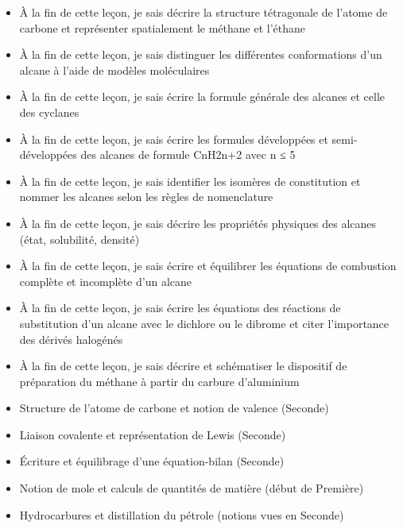 \documentclass[11pt]{article}
\begin{document}
\begin{objectifs}
\begin{itemize}
\item À la fin de cette leçon, je sais décrire la structure tétragonale de l'atome de carbone et représenter spatialement le méthane et l'éthane
\item À la fin de cette leçon, je sais distinguer les différentes conformations d'un alcane à l'aide de modèles moléculaires
\item À la fin de cette leçon, je sais écrire la formule générale des alcanes et celle des cyclanes
\item À la fin de cette leçon, je sais écrire les formules développées et semi-développées des alcanes de formule CnH2n+2 avec n ≤ 5
\item À la fin de cette leçon, je sais identifier les isomères de constitution et nommer les alcanes selon les règles de nomenclature
\item À la fin de cette leçon, je sais décrire les propriétés physiques des alcanes (état, solubilité, densité)
\item À la fin de cette leçon, je sais écrire et équilibrer les équations de combustion complète et incomplète d'un alcane
\item À la fin de cette leçon, je sais écrire les équations des réactions de substitution d'un alcane avec le dichlore ou le dibrome et citer l'importance des dérivés halogénés
\item À la fin de cette leçon, je sais décrire et schématiser le dispositif de préparation du méthane à partir du carbure d'aluminium
\end{itemize}
\end{objectifs}

\begin{prerequis}
\begin{itemize}
\item Structure de l'atome de carbone et notion de valence (Seconde)
\item Liaison covalente et représentation de Lewis (Seconde)
\item Écriture et équilibrage d'une équation-bilan (Seconde)
\item Notion de mole et calculs de quantités de matière (début de Première)
\item Hydrocarbures et distillation du pétrole (notions vues en Seconde)
\end{itemize}
\end{prerequis}
\end{document}

